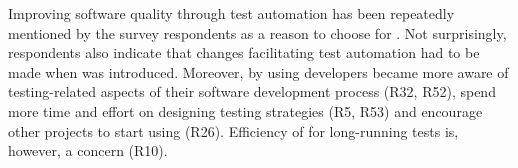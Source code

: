 Improving software quality through test automation has been repeatedly mentioned by the survey respondents as a reason to choose for \Tvis. 
Not surprisingly, respondents also indicate that changes facilitating test automation had to be made when \Tvis was introduced. 
Moreover, by using \Tvis developers became more aware of testing-related aspects of their software development process (R32, R52), 
spend more time and effort on designing testing strategies (R5, R53) and encourage other projects to start using \Tvis (R26).
Efficiency of \Tvis for long-running tests is, however, a concern (R10).

